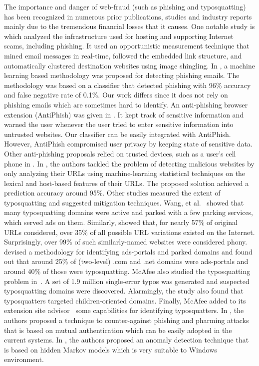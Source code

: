 \documentclass[twocolumn]{article}
\begin{document}
The importance and danger of web-fraud (such as phishing and typosquatting)
has been recognized in numerous prior publications, studies and industry 
reports mainly due to the tremendous financial losses 
\cite{phishloss2007} that it causes. One notable study is \cite{spamscatter} which analyzed the
infrastructure used for hosting and supporting Internet scams, including
phishing. It used an opportunistic measurement technique that 
mined email messages in real-time, followed the embedded
link structure, and automatically clustered destination websites using image
shingling. In \cite{learnphishemails},  a machine learning based methodology was 
proposed for detecting phishing emails. The methodology was based on a classifier 
that detected phishing with 96\% accuracy and false negative rate of 0.1\%. Our work 
differs since it does not rely on phishing emails which are sometimes hard to identify.
An anti-phishing browser extension (AntiPhish) was given in \cite{protectphish}.
It kept track of sensitive information and warned the user whenever the user tried to
enter sensitive information into untrusted websites. Our classifier 
can be easily integrated with AntiPhish. However, AntiPhish compromised user privacy 
by keeping state of sensitive data. Other anti-phishing proposals relied on trusted 
devices, such as a user's cell phone in \cite{phoolproof}. In \cite{beyond-blacklists}, 
the authors tackled the problem of detecting malicious
websites by only analyzing their URLs using machine-learning
statistical techniques on the lexical and host-based
features of their URLs. The proposed solution achieved a prediction
accuracy around 95\%. Other studies measured the extent of typosquatting and suggested
mitigation techniques. Wang, et al.~\cite{Wang} showed that many 
typosquatting domains were active and parked with a few parking services, which served
ads on them. Similarly, \cite{jaal} showed that, for nearly 57\% of original URLs considered,
over 35\% of all possible URL variations existed on the Internet. Surprisingly, over
99\% of such similarly-named websites were considered phony. \cite{ads-portal-class} devised a methodology 
for identifying ads-portals and parked domains and found out that around 25\% of (two-level) 
.com and .net  domains were ads-portals and around 40\% of those were typosquatting. 
McAfee also studied the typosquatting problem in~\cite{mcafeestudy}. A set of 1.9 million
single-error typos was generated and   suspected typosquatting domains
were discovered. Alarmingly, the study also found that typosquatters targeted children-oriented domains.
Finally, McAfee added to its extension site advisor~\cite{siteadvisor}  some
capabilities for identifying typosquatters. In \cite{nwjournal-phish-1}, the authors proposed a technique to counter-against phishing and pharming attacks that is based on mutual authentication which can be easily adopted in the current systems. In \cite{nwjournal-phish-2}, the authors proposed an anomaly detection technique that is based on hidden Markov models which is very suitable to Windows environment.
\end{document}
